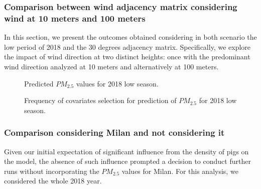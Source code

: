 \documentclass[11pt,a4paper]{article}
\begin{document}

\subsubsection{Comparison between wind adjacency matrix considering wind at 10 meters and 100 meters}
\label{sec:comp_wind}
In this section, we present the outcomes obtained considering in both scenario the low period of 2018 and the 30 degrees adjacency matrix. Specifically, we explore the impact of wind direction at two distinct heights: once with the predominant wind direction analyzed at 10 meters and alternatively at 100 meters.


\begin{figure}[H]
    \centering
    \hfill
    \centering
    \caption{Predicted $PM_{2.5}$ values for 2018 low season.}
    \label{fig:Comp_10_100}
\end{figure}

\begin{figure}[H]
    \centering
    \hfill
    \caption{Frequency of covariates selection for prediction of $PM_{\text{2.5}}$ for 2018 low season.}
    \label{fig: Covariates_Comp_10_100}
\end{figure}


\subsubsection{Comparison considering Milan and not considering it}
\label{sec:comp_Milan}
Given our initial expectation of significant influence from the density of pigs on the model, the absence of such influence prompted a decision to conduct further runs without incorporating the $PM_{\text{2.5}}$ values for Milan.
For this analysis, we considered the whole 2018 year.
\end{document}
